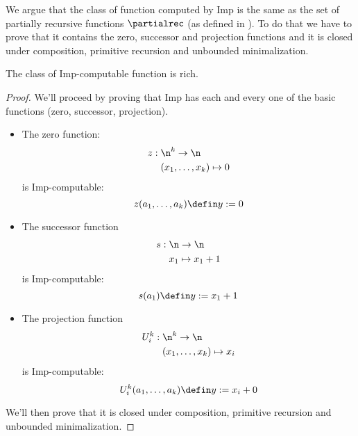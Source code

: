 We argue that the class of function computed by Imp is the same as the
set of partially recursive functions \(\partialrec\) (as defined in
\cite{cutland1980computability}). To do that we have to prove that it
contains the zero, successor and projection functions and it is closed
under composition, primitive recursion and unbounded minimalization.

\begin{lemma}
  The class of Imp-computable function is rich.
\end{lemma}

\begin{proof}

  We'll proceed by proving that Imp has each and every one of the
  basic functions (zero, successor, projection). 

  \begin{itemize}
  \item The zero function:
    \begin{align*}
      z : \; & \n^k \to \n \\
      & (x_1, \dots, x_k) \mapsto 0
    \end{align*}
    is Imp-computable: \[z(a_1,\dots,a_k) \defin y := 0\]
  \item The successor function
    \begin{align*}
      s : \; & \n \to \n \\
      & x_1 \mapsto x_1 + 1
    \end{align*}
    is Imp-computable: \[s(a_1) \defin y := x_1 + 1\]
  \item The projection function
    \begin{align*}
      U_i^k : \; & \n^k \to \n \\
      & (x_1,\dots,x_k) \mapsto x_i
    \end{align*}
    is Imp-computable: \[U_i^k(a_1, \dots, a_k) \defin y := x_i + 0\]
  \end{itemize}

  We'll then prove that it is closed under composition, primitive
  recursion and unbounded minimalization.


\end{proof}

